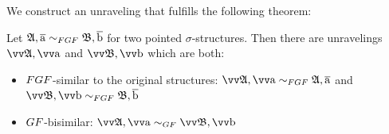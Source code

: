 We construct an unraveling that fulfills the following theorem:
\begin{theorem}\label{thm:inf-unraveling-upgrading}
  Let $\str{A}, \elemtuplea \bisimto_{\FGF} \str{B}, \elemtupleb$ for two pointed $\sigma$-structures.
  Then there are unravelings $\unravel{A}, \elemtuptuplea$ and $\unravel{B}, \elemtuptupleb$ which are both:
  \begin{itemize}
    \item $\FGF$-similar to the original structures: $\unravel{A}, \elemtuptuplea \bisimto_{\FGF} \str{A}, \elemtuplea$ and $\unravel{B}, \elemtuptupleb \bisimto_{\FGF} \str{B}, \elemtupleb$
    \item $\GF$-bisimilar: $\unravel{A}, \elemtuptuplea \bisimto_{\GF} \unravel{B}, \elemtuptupleb$
  \end{itemize}
\end{theorem}

